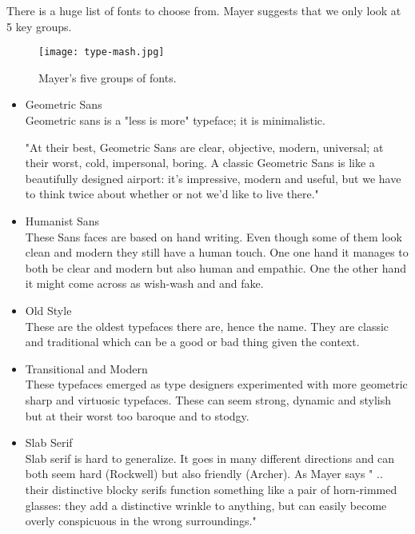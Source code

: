 There is a huge list of fonts to choose from. Mayer suggests that we only look at 5 key groups. 

\begin{figure}[H]
\centering
\texttt{[image: type-mash.jpg]}
\caption{Mayer's five groups of fonts. \cite{Font}}
\end{figure}

\begin{itemize}

\item
Geometric Sans
\\
Geometric sans is a "less is more" typeface; it is minimalistic.

"At their best, Geometric Sans are clear, objective, modern, universal; at their worst, cold, impersonal, boring. A classic Geometric Sans is like a beautifully designed airport: it's impressive, modern and useful, but we have to think twice about whether or not we'd like to live there." \cite{Font} %

\item
Humanist Sans
\\
These Sans faces are based on hand writing. Even though some of them look clean and modern they still have a human touch. One one hand it manages to both be clear and modern but also human and empathic. One the other hand it might come across as wish-wash and and fake. \cite{Font}

\item
Old Style
\\
These are the oldest typefaces there are, hence the name. 
They are classic and traditional which can be a good or bad thing given the context. 

\item
Transitional and Modern
\\
These typefaces emerged as type designers experimented with more geometric sharp and virtuosic typefaces. 
These can seem strong, dynamic and stylish but at their worst too baroque and to stodgy. \cite{Font} 

\item
Slab Serif
\\
Slab serif is hard to generalize. It goes in many different directions and can both seem hard (Rockwell) but also friendly (Archer). As Mayer says " .. their distinctive blocky serifs function something like a pair of horn-rimmed glasses: they add a distinctive wrinkle to anything, but can easily become overly conspicuous in the wrong surroundings." \cite{Font}
\end{itemize}


